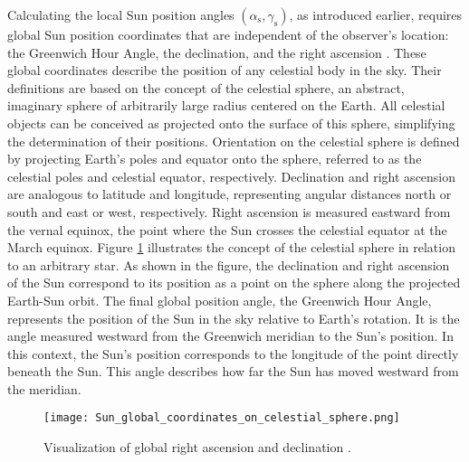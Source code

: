 Calculating the local Sun position angles \((\alpha_{\text{s}}, \gamma_{\text{s}})\), as introduced earlier, 
requires global Sun position coordinates that are independent of the observer's location: 
the Greenwich Hour Angle, the declination, and the right ascension \cite{Munner1993, Muneer1989}. 
These global coordinates describe the position of any celestial body in the sky. Their definitions 
are based on the concept of the celestial sphere, an abstract, imaginary sphere of arbitrarily 
large radius centered on the Earth. All celestial objects can be conceived as projected onto 
the surface of this sphere, simplifying the determination of their positions.
Orientation on the celestial sphere is defined by projecting Earth's poles and equator
onto the sphere, referred to as the celestial poles and celestial equator, respectively.
Declination and right ascension are analogous to latitude and longitude, representing angular
distances north or south and east or west, respectively. Right ascension is measured eastward
from the vernal equinox, the point where the Sun crosses the celestial equator at the March
equinox. Figure \ref{fig:Sun_global_coordinates_on_celestial_sphere} illustrates the concept
of the celestial sphere in relation to an arbitrary star.
As shown in the figure, the declination and right ascension of the Sun correspond to its
position as a point on the sphere along the projected Earth-Sun orbit. The final global
position angle, the Greenwich Hour Angle, represents the position of the Sun in the sky
relative to Earth's rotation. It is the angle measured westward from the Greenwich meridian
to the Sun's position. In this context, the Sun's position corresponds to the longitude
of the point directly beneath the Sun. This angle describes how far the Sun has moved
westward from the meridian.

\begin{figure}
    \centering
    \texttt{[image: Sun\_global\_coordinates\_on\_celestial\_sphere.png]}
    \caption{\small Visualization of global right ascension and declination \cite{WikipediaRightAscension}.}
    \label{fig:Sun_global_coordinates_on_celestial_sphere}
\end{figure}

